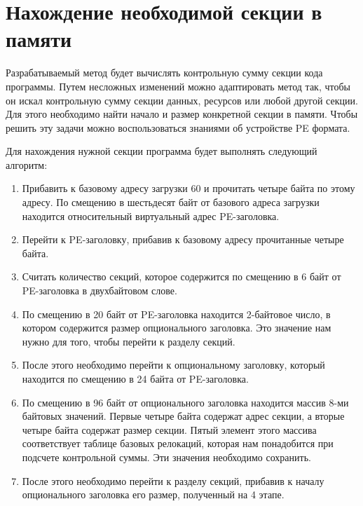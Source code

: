 
\section{Нахождение необходимой секции в памяти}

Разрабатываемый метод будет вычислять контрольную сумму секции кода программы.
Путем несложных изменений можно адаптировать метод так, чтобы он искал
контрольную сумму секции данных, ресурсов или любой другой секции. Для этого
необходимо найти начало и размер конкретной секции в памяти. Чтобы решить эту
задачи можно воспользоваться знаниями об устройстве PE формата. 

Для нахождения нужной секции программа будет выполнять следующий алгоритм:
\begin{enumerate}
  \item Прибавить к базовому адресу загрузки 60 и прочитать четыре байта по этому
    адресу. По смещению в шестьдесят байт от базового адреса загрузки находится
    относительный виртуальный адрес PE-заголовка.
    
  \item Перейти к PE-заголовку, прибавив к базовому адресу прочитанные четыре
    байта. 

  \item Считать количество секций, которое содержится по смещению в 6 байт от
    PE-заголовка в двухбайтовом слове.

  \item По смещению в 20 байт от PE-заголовка находится 2-байтовое число, в
    котором содержится размер опционального заголовка. Это значение нам нужно
    для того, чтобы перейти к разделу секций.

  \item После этого необходимо перейти к опциональному заголовку, который
    находится по смещению в 24 байта от PE-заголовка. 

  \item По смещению в 96 байт от опционального заголовка находится массив 8-ми
    байтовых значений. Первые четыре байта содержат адрес секции, а вторые
    четыре байта содержат размер секции. Пятый элемент этого массива
    соответствует таблице базовых релокаций, которая нам понадобится при
    подсчете контрольной суммы. Эти значения необходимо сохранить.

  \item После этого необходимо перейти к разделу секций, прибавив к началу
    опционального заголовка его размер, полученный на 4 этапе.


\end{enumerate}
